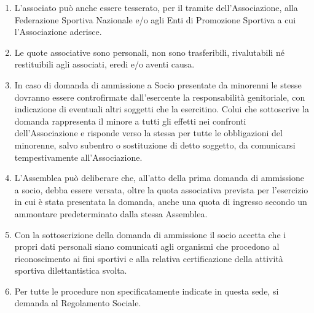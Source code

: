 \documentclass{djtsasddoc}
\begin{document}
\begin{enumerate}
		\item L'associato può anche essere tesserato, per il tramite dell'Associazione, alla Federazione Sportiva Nazionale e/o agli Enti di Promozione Sportiva a cui l'Associazione aderisce.
		\item Le quote associative sono personali, non sono trasferibili, rivalutabili né restituibili agli associati, eredi e/o aventi causa.
		\item In caso di domanda di ammissione a Socio presentate da minorenni le stesse dovranno essere controfirmate dall'esercente la responsabilità genitoriale, con indicazione di eventuali altri soggetti che la esercitino. Colui che sottoscrive la domanda rappresenta il minore a tutti gli effetti nei confronti dell'Associazione e risponde verso la stessa per tutte le obbligazioni del minorenne, salvo subentro o sostituzione di detto soggetto, da comunicarsi tempestivamente all'Associazione.
		\item L'Assemblea può deliberare che, all'atto della prima domanda di ammissione a socio, debba essere versata, oltre la quota associativa prevista per l'esercizio in cui è stata presentata la domanda, anche una quota di ingresso secondo un ammontare predeterminato dalla stessa Assemblea.
		\item Con la sottoscrizione della domanda di ammissione il socio accetta che i propri dati personali siano comunicati agli organismi che procedono al riconoscimento ai fini sportivi e alla relativa certificazione della attività sportiva dilettantistica svolta.
		\item Per tutte le procedure non specificatamente indicate in questa sede, si demanda al Regolamento Sociale.
	\end{enumerate}
	
\end{document}
